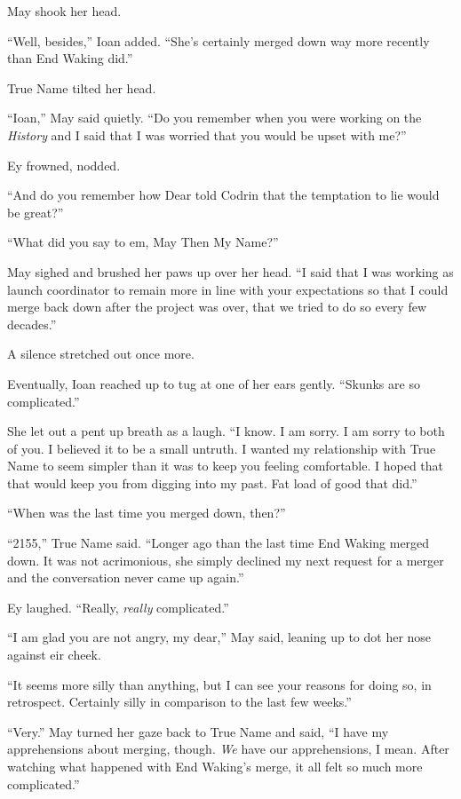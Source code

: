 May shook her head.

``Well, besides,'' Ioan added. ``She's certainly merged down way more recently than End Waking did.''

True Name tilted her head.

``Ioan,'' May said quietly. ``Do you remember when you were working on the \emph{History} and I said that I was worried that you would be upset with me?''

Ey frowned, nodded.

``And do you remember how Dear told Codrin that the temptation to lie would be great?''

``What did you say to em, May Then My Name?''

May sighed and brushed her paws up over her head. ``I said that I was working as launch coordinator to remain more in line with your expectations so that I could merge back down after the project was over, that we tried to do so every few decades.''

A silence stretched out once more.

Eventually, Ioan reached up to tug at one of her ears gently. ``Skunks are so complicated.''

She let out a pent up breath as a laugh. ``I know. I am sorry. I am sorry to both of you. I believed it to be a small untruth. I wanted my relationship with True Name to seem simpler than it was to keep you feeling comfortable. I hoped that that would keep you from digging into my past. Fat load of good that did.''

``When was the last time you merged down, then?''

``2155,'' True Name said. ``Longer ago than the last time End Waking merged down. It was not acrimonious, she simply declined my next request for a merger and the conversation never came up again.''

Ey laughed. ``Really, \emph{really} complicated.''

``I am glad you are not angry, my dear,'' May said, leaning up to dot her nose against eir cheek.

``It seems more silly than anything, but I can see your reasons for doing so, in retrospect. Certainly silly in comparison to the last few weeks.''

``Very.'' May turned her gaze back to True Name and said, ``I have my apprehensions about merging, though. \emph{We} have our apprehensions, I mean. After watching what happened with End Waking's merge, it all felt so much more complicated.''

